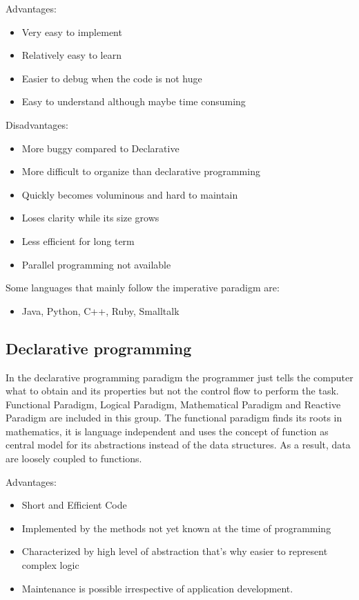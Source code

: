 Advantages:
\begin{itemize}[noitemsep]
    \item Very easy to implement
    \item Relatively easy to learn
    \item Easier to debug when the code is not huge
    \item Easy to understand although maybe time consuming
\end{itemize}

Disadvantages:
\begin{itemize}[noitemsep]
    \item More buggy compared to Declarative
    \item More difficult to organize than declarative programming
    \item Quickly becomes voluminous and hard to maintain 
    \item Loses clarity while its size grows
    \item Less efficient for long term
    \item Parallel programming not available
\end{itemize}

Some languages that mainly follow the imperative paradigm are:
\begin{itemize}
    \item Java, Python, C++, Ruby, Smalltalk
\end{itemize}
        
        \vspace{-.5cm}
        \subsection*{Declarative programming}
In the declarative programming paradigm the programmer just tells the computer what to obtain and its properties but not the control flow to perform the task.
Functional Paradigm, Logical Paradigm, Mathematical Paradigm and Reactive Paradigm are included in this group.
The functional paradigm finds its roots in mathematics, it is language independent and
uses the concept of function as central model for its abstractions instead of the data structures.
As a result, data are loosely coupled to functions.

Advantages:
\begin{itemize}[noitemsep]
    \item Short and Efficient Code
    \item Implemented by the methods not yet known at the time of programming
    \item Characterized by high level of abstraction that's why easier to represent complex logic
    \item Maintenance is possible irrespective of application development.
\end{itemize}


